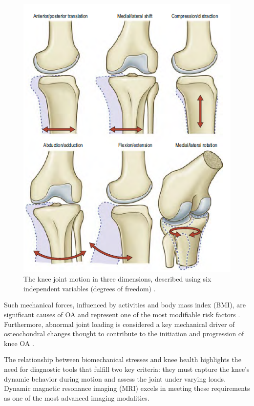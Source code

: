 \documentclass{micro-econ-thesis}
\begin{document}
\begin{figure}[H]
	\centering
	\includegraphics[width=0.7\linewidth]{six_degrees}
	\caption{The knee joint motion in three dimensions, described using six independent variables (degrees of freedom) \parencite[p.~1412]{standring_grays_2021}.}
	\label{fig:sixdegrees}
\end{figure}

Such mechanical forces, influenced by activities and body mass index (BMI), are significant causes of OA and represent one of the most modifiable risk factors \parencite{heidari_knee_2011}. Furthermore, abnormal joint loading is considered a key mechanical driver of osteochondral changes thought to contribute to the initiation and progression of knee OA \parencite{coburn_immediate_2023}.


The relationship between biomechanical stresses and knee health highlights the need for diagnostic tools that fulfill two key criteria: they must capture the knee's dynamic behavior during motion and assess the joint under varying loads. Dynamic magnetic resonance imaging (MRI) excels in meeting these requirements as one of the most advanced imaging modalities.
\end{document}
